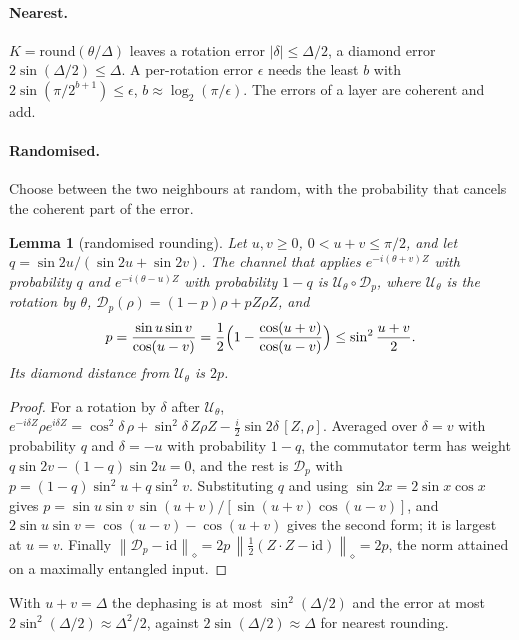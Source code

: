 \documentclass[aps,prx,twocolumn,superscriptaddress,nofootinbib,longbibliography]{revtex4-2}
\newtheorem{lemma}[theorem]{Lemma}
\theoremstyle{remark}
\newcommand{\diam}[1]{\left\lVert #1\right\rVert_\diamond}
\begin{document}
\paragraph*{Nearest.} $K=\mathrm{round}(\theta/\Delta)$ leaves a rotation error $|\delta|\le
\Delta/2$, a diamond error $2\sin(\Delta/2)\le\Delta$. A per-rotation error $\epsilon$ needs
the least $b$ with $2\sin(\pi/2^{b+1})\le\epsilon$, $b\approx\log_2(\pi/\epsilon)$. The errors
of a layer are coherent and add.

\paragraph*{Randomised.} Choose between the two neighbours at random, with the probability that
cancels the coherent part of the error.

\begin{lemma}[randomised rounding]\label{lem:mix}
Let $u,v\ge0$, $0<u+v\le\pi/2$, and let $q=\sin2u/(\sin2u+\sin2v)$. The channel that applies
$e^{-i(\theta+v)Z}$ with probability $q$ and $e^{-i(\theta-u)Z}$ with probability $1-q$ is
$\mathcal U_\theta\circ\mathcal D_p$, where $\mathcal U_\theta$ is the rotation by $\theta$,
$\mathcal D_p(\rho)=(1-p)\rho+pZ\rho Z$, and
\begin{equation}
  p=\frac{\sin u\sin v}{\cos(u-v)}=\frac12\Bigl(1-\frac{\cos(u+v)}{\cos(u-v)}\Bigr)
  \le\sin^2\frac{u+v}{2}.
\end{equation}
Its diamond distance from $\mathcal U_\theta$ is $2p$.
\end{lemma}

\begin{proof}
For a rotation by $\delta$ after $\mathcal U_\theta$,
$e^{-i\delta Z}\rho e^{i\delta Z}=\cos^2\!\delta\,\rho+\sin^2\!\delta\,Z\rho Z
-\tfrac i2\sin2\delta\,[Z,\rho]$. Averaged over $\delta=v$ with probability $q$ and
$\delta=-u$ with probability $1-q$, the commutator term has weight
$q\sin2v-(1-q)\sin2u=0$, and the rest is $\mathcal D_p$ with
$p=(1-q)\sin^2u+q\sin^2v$. Substituting $q$ and using $\sin2x=2\sin x\cos x$ gives
$p=\sin u\sin v\,\sin(u+v)/[\sin(u+v)\cos(u-v)]$, and $2\sin u\sin v=\cos(u-v)-\cos(u+v)$
gives the second form; it is largest at $u=v$. Finally
$\diam{\mathcal D_p-\mathrm{id}}=2p\,\diam{\tfrac12(Z\cdot Z-\mathrm{id})}=2p$, the norm
attained on a maximally entangled input.
\end{proof}

With $u+v=\Delta$ the dephasing is at most $\sin^2(\Delta/2)$ and the error at most
$2\sin^2(\Delta/2)\approx\Delta^2/2$, against $2\sin(\Delta/2)\approx\Delta$ for nearest
rounding.
\end{document}
